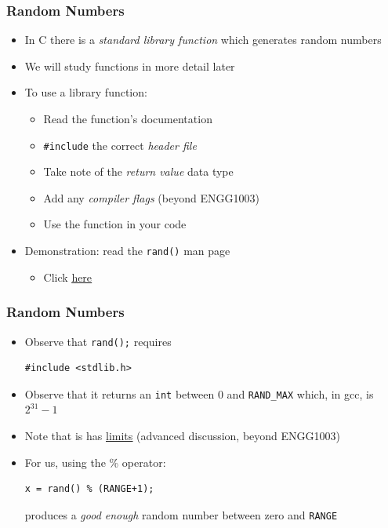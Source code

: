 \documentclass[14pt]{beamer}
\begin{document}
\begin{frame}[fragile]
\frametitle{Random Numbers}
\begin{itemize}
\item In C there is a \textit{standard library function} which generates random numbers
\item We will study functions in more detail later
\item To use a library function:
	\begin{itemize}
		\item Read the function's documentation
		\item \texttt{\#include} the correct \textit{header file}
		\item Take note of the \textit{return value} data type
		\item Add any \textit{compiler flags} (beyond ENGG1003)
		\item Use the function in your code
	\end{itemize}
\item Demonstration: read the \texttt{rand()} man page
	\begin{itemize}
		\item Click \underline{\href{http://man7.org/linux/man-pages/man3/rand.3.html}{here}}
	\end{itemize}
\end{itemize}
\end{frame}

\begin{frame}[fragile]
\frametitle{Random Numbers}
\begin{itemize}
\item Observe that \texttt{rand();} requires 
\begin{lstlisting}[style=CStyle]
#include <stdlib.h>
\end{lstlisting}
\item Observe that it returns an \texttt{int} between 0 and \texttt{RAND\_MAX} which, in gcc, is $2^{31}-1$
\item Note that is has \underline{\href{http://www.azillionmonkeys.com/qed/random.html}{limits}} (advanced discussion, beyond ENGG1003)
\item For us, using the \% operator:
\begin{lstlisting}[style=CStyle]
x = rand() % (RANGE+1);
\end{lstlisting}
produces a \textit{good enough} random number between zero and \texttt{RANGE}
\end{itemize}
\end{frame}
\end{document}
